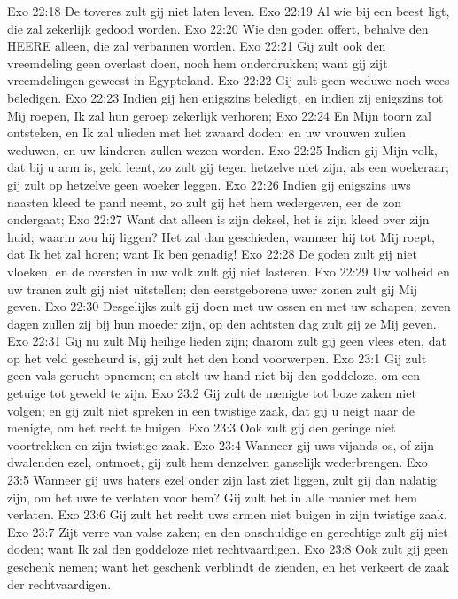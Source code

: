 Exo 22:18  De toveres zult gij niet laten leven.
Exo 22:19  Al wie bij een beest ligt, die zal zekerlijk gedood worden.
Exo 22:20  Wie den goden offert, behalve den HEERE alleen, die zal verbannen worden.
Exo 22:21  Gij zult ook den vreemdeling geen overlast doen, noch hem onderdrukken; want gij zijt vreemdelingen geweest in Egypteland.
Exo 22:22  Gij zult geen weduwe noch wees beledigen.
Exo 22:23  Indien gij hen enigszins beledigt, en indien zij enigszins tot Mij roepen, Ik zal hun geroep zekerlijk verhoren;
Exo 22:24  En Mijn toorn zal ontsteken, en Ik zal ulieden met het zwaard doden; en uw vrouwen zullen weduwen, en uw kinderen zullen wezen worden.
Exo 22:25  Indien gij Mijn volk, dat bij u arm is, geld leent, zo zult gij tegen hetzelve niet zijn, als een woekeraar; gij zult op hetzelve geen woeker leggen.
Exo 22:26  Indien gij enigszins uws naasten kleed te pand neemt, zo zult gij het hem wedergeven, eer de zon ondergaat;
Exo 22:27  Want dat alleen is zijn deksel, het is zijn kleed over zijn huid; waarin zou hij liggen? Het zal dan geschieden, wanneer hij tot Mij roept, dat Ik het zal horen; want Ik ben genadig!
Exo 22:28  De goden zult gij niet vloeken, en de oversten in uw volk zult gij niet lasteren.
Exo 22:29  Uw volheid en uw tranen zult gij niet uitstellen; den eerstgeborene uwer zonen zult gij Mij geven.
Exo 22:30  Desgelijks zult gij doen met uw ossen en met uw schapen; zeven dagen zullen zij bij hun moeder zijn, op den achtsten dag zult gij ze Mij geven.
Exo 22:31  Gij nu zult Mij heilige lieden zijn; daarom zult gij geen vlees eten, dat op het veld gescheurd is, gij zult het den hond voorwerpen.
Exo 23:1  Gij zult geen vals gerucht opnemen; en stelt uw hand niet bij den goddeloze, om een getuige tot geweld te zijn.
Exo 23:2  Gij zult de menigte tot boze zaken niet volgen; en gij zult niet spreken in een twistige zaak, dat gij u neigt naar de menigte, om het recht te buigen.
Exo 23:3  Ook zult gij den geringe niet voortrekken en zijn twistige zaak.
Exo 23:4  Wanneer gij uws vijands os, of zijn dwalenden ezel, ontmoet, gij zult hem denzelven ganselijk wederbrengen.
Exo 23:5  Wanneer gij uws haters ezel onder zijn last ziet liggen, zult gij dan nalatig zijn, om het uwe te verlaten voor hem? Gij zult het in alle manier met hem verlaten.
Exo 23:6  Gij zult het recht uws armen niet buigen in zijn twistige zaak.
Exo 23:7  Zijt verre van valse zaken; en den onschuldige en gerechtige zult gij niet doden; want Ik zal den goddeloze niet rechtvaardigen.
Exo 23:8  Ook zult gij geen geschenk nemen; want het geschenk verblindt de zienden, en het verkeert de zaak der rechtvaardigen.
